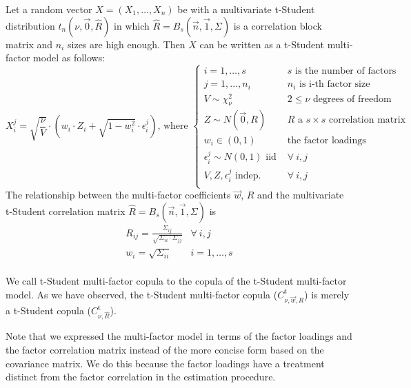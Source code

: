 \documentclass[11pt,fleqn]{book} %
\begin{document}
\begin{proposition}
	\label{prop:tmfm}
	Let a random vector $X=(X_1,\dots,X_n)$ be with a multivariate t-Student 
	distribution $t_n(\nu,\vec{0},\widehat{R})$ in which 
	$\widehat{R} = B_s(\vec{n},\vec{1},\Sigma)$ is a correlation block matrix 
	and $n_i$ sizes are high enough. Then $X$ can be written as a t-Student 
	multi-factor model as follows:
	\begin{displaymath}
		X_i^j = \sqrt{\frac{\nu}{V}} \cdot 
		\left( w_i \cdot Z_i + \sqrt{1-w_i^2} \cdot \epsilon_i^j \right)
		\text{, where } \left\{
		\begin{array}{ll}
			i = 1, \dots, s & \text{$s$ is the number of factors} \\
			j = 1, \dots, n_i & \text{$n_i$ is i-th factor size} \\
			V \sim \chi_{\nu}^2 & 2 \le \nu \text{ degrees of freedom} \\
			Z \sim N(\vec{0},R) & \text{$R$ a $s {\times} s$ correlation matrix} \\
			w_i \in (0,1) & \text{the factor loadings } \\
			\epsilon_i^j \sim N(0,1) \text { iid } & \forall\ i,j \\
			V, Z, \epsilon_i^j \text{ indep. } & \forall\ i,j \\
		\end{array}
		\right.
	\end{displaymath}
	The relationship between the multi-factor coefficients $\vec{w}$, $R$ 
	and the multivariate t-Student correlation matrix 
	$\widehat{R} = B_s(\vec{n},\vec{1},\Sigma)$ is
	\begin{displaymath}
		\begin{array}{ll}
			R_{ij} = \frac{\Sigma_{ij}}{\sqrt{\Sigma_{ii} \cdot \Sigma_{jj}}} & \forall\ i,j \\
			w_i = \sqrt{\Sigma_{ii}} & i = 1,\dots,s \\
		\end{array}
	\end{displaymath}
\end{proposition}

We call t-Student multi-factor copula to the copula of the t-Student 
multi-factor model. As we have observed, the t-Student multi-factor copula 
($C_{\nu,\vec{w},R}^{\text{t}}$) is merely a t-Student copula 
($C_{\nu,\widehat{R}}^{\text{t}}$).

Note that we expressed the multi-factor model in terms of the factor loadings 
and the factor correlation matrix instead of the more concise form based on 
the covariance matrix. We do this because the factor loadings have a treatment 
distinct from the factor correlation in the estimation procedure.
\end{document}
